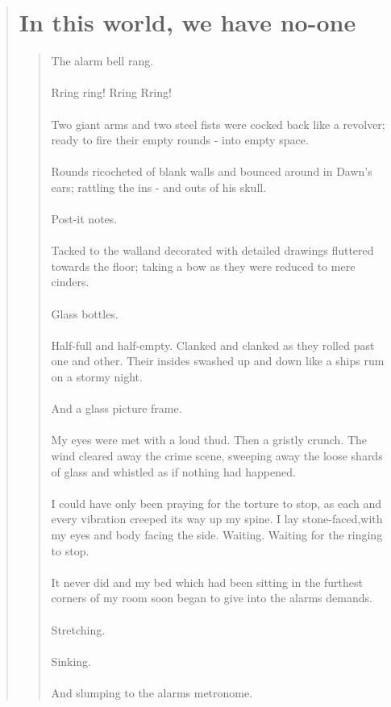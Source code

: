 \documentclass{book}
\begin{document}
\begin{quote}
\chapter{In this world, we have no-one}
\begin{quote}
The alarm bell rang.\\\\
Rring ring! Rring Rring!\\\\
Two giant arms and two steel fists were cocked back like a revolver; ready to fire their empty rounds - into empty space.\\\\
Rounds ricocheted of blank walls and bounced around in Dawn's ears; rattling the ins - and outs of his skull.\\\\
Post-it notes.\\\\ Tacked to the walland decorated with detailed drawings fluttered towards the floor; taking a bow as they were reduced to mere cinders.\\\\ Glass bottles.\\\\
Half-full and half-empty. Clanked and clanked as they rolled  past one and other. Their insides swashed up and down like a ships rum on a stormy night.\\\\
And a glass picture frame.\\\\
My eyes were met with a loud thud. Then a gristly crunch. The wind cleared away the crime scene, sweeping away the loose shards of glass and whistled as if nothing had happened.\\\\
I could have only been praying for the torture to stop, as each and every vibration creeped its way up my spine. I lay stone-faced,with my eyes and body facing the side. Waiting. Waiting for the ringing to stop.\\\\
It never did and my bed which had been sitting in the furthest corners of my room soon began to give into the alarms demands.\\\\
Stretching.\\\\
Sinking.\\\\ And slumping to the alarms metronome.

\end{quote}
\end{quote}
\end{document}
